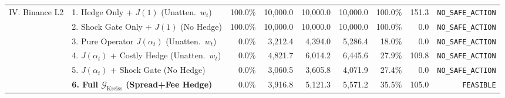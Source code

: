 \begin{table}[htbp]
{\begin{tabular}{llrrrrrrr}
\midrule
IV. Binance L2 & 1. Hedge Only + $J(1)$ (Unatten.\ $w_t$) & 100.0\% & 10,000.0 & 10,000.0 & 10,000.0 & 100.0\% & 151.3 & \texttt{NO\_SAFE\_ACTION} \\
 & 2. Shock Gate Only + $J(1)$ (No Hedge) & 100.0\% & 10,000.0 & 10,000.0 & 10,000.0 & 100.0\% & 0.0 & \texttt{NO\_SAFE\_ACTION} \\
 & 3. Pure Operator $J(\alpha_t)$ (Unatten.\ $w_t$) & 0.0\% & 3,212.4 & 4,394.0 & 5,286.4 & 18.0\% & 0.0 & \texttt{NO\_SAFE\_ACTION} \\
 & 4. $J(\alpha_t)$ + Costly Hedge (Unatten.\ $w_t$) & 0.0\% & 4,821.7 & 6,014.2 & 6,445.6 & 27.9\% & 109.8 & \texttt{NO\_SAFE\_ACTION} \\
 & 5. $J(\alpha_t)$ + Shock Gate (No Hedge) & 0.0\% & 3,060.5 & 3,605.8 & 4,071.9 & 27.4\% & 0.0 & \texttt{NO\_SAFE\_ACTION} \\
 & \textbf{6. Full $\mathcal{G}_{\mathrm{Kreiss}}$ (Spread+Fee Hedge)} & 0.0\% & 3,916.8 & 5,121.3 & 5,571.2 & 35.5\% & 105.0 & \texttt{FEASIBLE} \\
\bottomrule
\end{tabular}%
}
\end{table}
